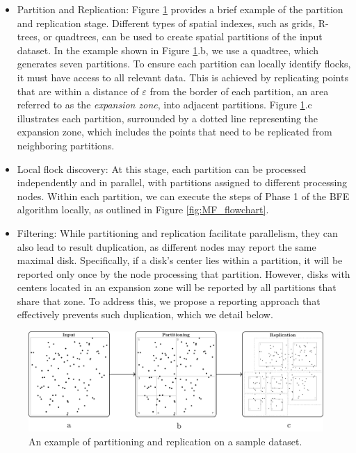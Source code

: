 \begin{itemize}
    \item Partition and Replication: Figure \ref{fig:partrep} provides a brief example of the partition and replication stage. Different types of spatial indexes, such as grids, R-trees, or quadtrees, can be used to create spatial partitions of the input dataset. In the example shown in Figure \ref{fig:partrep}.b, we use a quadtree, which generates seven partitions. To ensure each partition can locally identify flocks, it must have access to all relevant data. This is achieved by replicating points that are within a distance of $\varepsilon$ from the border of each partition, an area referred to as the \textit{expansion zone}, into adjacent partitions. Figure \ref{fig:partrep}.c illustrates each partition, surrounded by a dotted line representing the expansion zone, which includes the points that need to be replicated from neighboring partitions.

    \item Local flock discovery: At this stage, each partition can be processed independently and in parallel, with partitions assigned to different processing nodes. Within each partition, we can execute the steps of Phase 1 of the BFE algorithm locally, as outlined in Figure \ref{fig:MF_flowchart}.

    \item Filtering: While partitioning and replication facilitate parallelism, they can also lead to result duplication, as different nodes may report the same maximal disk. Specifically, if a disk's center lies within a partition, it will be reported only once by the node processing that partition. However, disks with centers located in an expansion zone will be reported by all partitions that share that zone. To address this, we propose a reporting approach that effectively prevents such duplication, which we detail below.
\end{itemize}

\begin{figure}
    \centering
    \includegraphics[width=\linewidth]{figures/MF_stages/P123}
    \caption{An example of partitioning and replication on a sample dataset.}\label{fig:partrep}
\end{figure}


